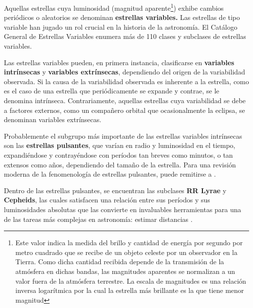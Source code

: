 \par Aquellas estrellas cuya luminosidad (magnitud aparente\footnote{Este valor indica la medida del brillo y cantidad de energía por segundo por metro cuadrado que se recibe de un objeto celeste por un observador en la Tierra. Como dicha cantidad recibida depende de la transmisión de la atmósfera en dichas bandas, las magnitudes aparentes se normalizan a un valor fuera de la atmósfera terrestre. La escala de magnitudes es una relación inversa logarítmica por la cual la estrella más brillante es la que tiene menor magnitud}) exhibe cambios periódicos o aleatorios se denominan \textbf{estrellas variables.} Las estrellas de tipo variable han jugado un rol crucial en la historia de la astronomía. El Catálogo General de Estrellas Variables \cite{catalogo} enumera más de 110 clases y subclases de estrellas variables. \\

\par Las estrellas variables pueden, en primera instancia, clasificarse en \textbf{variables intrínsecas} y \textbf{variables extrínsecas}, dependiendo del origen de la variabilidad observada. Si la causa de la variabilidad observada es inherente a la estrella, como es el caso de una estrella que periódicamente se expande y contrae, se le denomina intrínseca. Contrariamente, aquellas estrellas cuya variabilidad se debe a factores externos, como un compañero orbital que ocasionalmente la eclipsa, se denominan variables extrínsecas. \\

\par Probablemente el subgrupo más importante de las estrellas variables intrínsecas son las \textbf{estrellas pulsantes}, que varían en radio y luminosidad en el tiempo, expandiéndose y contrayéndose con períodos tan breves como minutos, o tan extensos como años, dependiendo del tamaño de la estrella. Para una revisión moderna de la fenomenología de estrellas pulsantes, puede remitirse a \cite{fisica}. \\

\par  Dentro de las estrellas pulsantes, se encuentran las subclases \textbf{RR Lyrae} y \textbf{Cepheids}, las cuales satisfacen una relación entre sus períodos y sus luminosidades absolutas que las convierte en invaluables herramientas para una de las tareas más complejas en astronomía: estimar distancias \cite{Shapley} \cite{Baade}. \\

